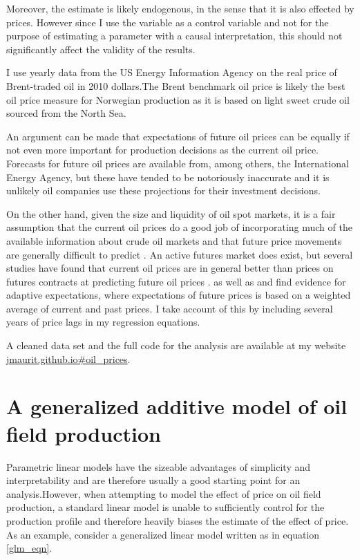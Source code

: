 \documentclass[11pt]{article}
\begin{document}
Moreover, the estimate is likely endogenous, in the sense that it is also effected by prices.  However since I use the variable as a control variable and not for the purpose of estimating a parameter with a causal interpretation, this should not significantly affect the validity of the results.  

I use yearly data from the US Energy Information Agency on the real price of Brent-traded oil in 2010 dollars.The Brent benchmark oil price is likely the best oil price measure for Norwegian production as it is based on light sweet crude oil sourced from the North Sea.  

An argument can be made that expectations of future oil prices can be equally if not even more important for production decisions as the current oil price.  Forecasts for future oil prices are available from, among others, the International Energy Agency, but these have tended to be notoriously inaccurate and it is unlikely oil companies use these projections for their investment decisions.  

On the other hand, given the size and liquidity of oil spot markets, it is a fair assumption that the current oil prices do a good job of incorporating much of the available information about crude oil markets and that future price movements are generally difficult to predict \citep{hamilton_understanding_2008}.  An active futures market does exist, but several studies have found that current oil prices are in general better than prices on futures contracts at predicting future oil prices \citep{alquist_what_2010, chinn_predictive_2005}.  \citet{mohn_investment_2008} as well as \citet{pesaran_econometric_1990} and \citet{farzin_impact_2001} find evidence for adaptive expectations, where expectations of future prices is based on a weighted average of current and past prices.  I take account of this by including several years of price lags in my regression equations.  

A cleaned data set and the full code for the analysis are available at my website \url{jmaurit.github.io#oil_prices}.

\section{A generalized additive model of oil field production}
Parametric linear models have the sizeable advantages of simplicity and interpretability and are therefore usually a good starting point for an analysis.However, when attempting to model the effect of price on oil field production, a standard linear model is unable to sufficiently control for the production profile and therefore heavily biases the estimate of the effect of price.  As an example, consider a generalized linear model written as in equation \ref{glm_eqn}. 
\end{document}
